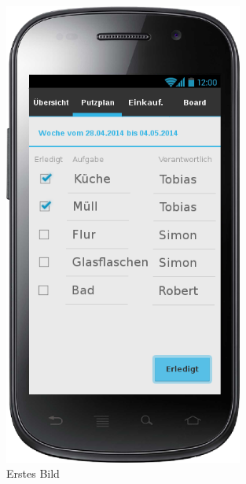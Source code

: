 \begin{figure}[htbp] 
  \centering
     \includegraphics[width=0.7\textwidth]{anhang/mockups/putzplan.png}
  \caption{Erstes Bild}
  \label{fig:Bild1}
\end{figure}

